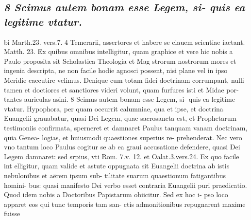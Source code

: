 \documentclass{article}
\begin{document}
\begin{pages}
\subsection*{\textit{8 Scimus autem bonam esse Legem, si- quis ea legitime vtatur.}}bi Marth.23. vers.7. 4 Temerarii, assertores et habere se clauem scientiae iactant. Matth. 23. Ex quibus omnibus intelligitur, quam graphice et vere hic nobis a Paulo proposita sit Scholastica Theologia et Mag strorum nostrorum mores et ingenia descripta, ne non facile hodie agnosci possent, nisi plane vel in ipso Meridie caecutire velimus. Denique cum totam fidei doctrinam corrumpant, nulli tamen et doctiores et sanctiores videri volunt, quam furfures isti et Midae por- tantes auriculas asini. 8 Scimus autem bonam esse Legem, si- quis ea legitime vtatur. Hypophora, per quam occurrit calumniae, qua et ipse, et doctrina Euangelii grauabatur, quasi Dei Legem, quae sacrosancta est, et Prophetarum testimoniis confirmata, sperneret et damnaret Paulus tanquam vanam doctrinam, quia Genea- logias, et huiusmodi quaestiones superius re- prehenderat. Nec vero vno tantum loco Paulus cogitur se ab ea graui accusatione defendere, quasi Dei Legem damnaret: sed srpius, vti Rom. 7.v. 12. et Oalat.3.vers.24. Ex quo facile int elligitur, quam valide et astute oppugnata sit Euangelii doctrina ab istis nebulonibus et aërem ipsum sub- tilitate suarum quaestionum fatigantibus homini- bus: quasi manifesto Dei verbo esset contraria Euangelii puri praedicatio. Quod idem nobis a Doctoribus Papistarum obiicitur. Sed ex hoc i- pso loco apparet eos qui tunc temporis tam san- ctis admonitionibus repugnarent maxime fuisse  \pend

\end{pages}
\end{document}
